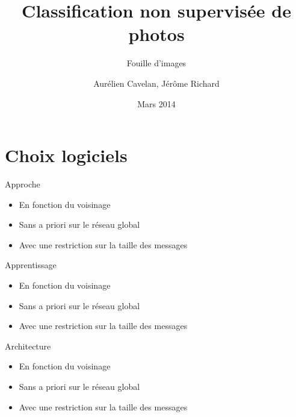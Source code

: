 \documentclass[xcolor=table]{beamer}
\title{Classification non supervisée de photos}
\subtitle{Fouille d'images}
\author{Aurélien Cavelan, Jérôme Richard}
\institute{Université d'Orléans}
\date{Mars 2014}
\begin{document}
	
\frame{\titlepage}


	
	

\section{Choix logiciels}

	\begin{frame}{Approche}
		\begin{itemize}
			\item En fonction du voisinage
			\item Sans a priori sur le réseau global
			\item Avec une restriction sur la taille des messages
		\end{itemize}
	\end{frame}

	\begin{frame}{Apprentissage}
		\begin{itemize}
			\item En fonction du voisinage
			\item Sans a priori sur le réseau global
			\item Avec une restriction sur la taille des messages
		\end{itemize}
	\end{frame}

	\begin{frame}{Architecture}
		\begin{itemize}
			\item En fonction du voisinage
			\item Sans a priori sur le réseau global
			\item Avec une restriction sur la taille des messages
		\end{itemize}
	\end{frame}
\end{document}
